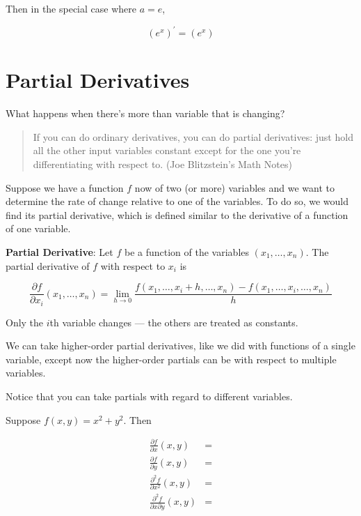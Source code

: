 \documentclass[]{book}
\theoremstyle{definition}
\theoremstyle{definition}
\theoremstyle{definition}
\theoremstyle{remark}
\let\BeginKnitrBlock\begin \let\EndKnitrBlock\end
\begin{document}
Then in the special case where \(a = e\),

\[(e^x)^\prime = (e^x)\]

\hypertarget{partial-derivatives}{%
\section{Partial Derivatives}\label{partial-derivatives}}

What happens when there's more than variable that is changing?

\begin{quote}
If you can do ordinary derivatives, you can do partial derivatives: just hold all the other input variables constant except for the one you're differentiating with respect to. (Joe Blitzstein's Math Notes)
\end{quote}

Suppose we have a function \(f\) now of two (or more) variables and we want to determine the rate of change relative to one of the variables. To do so, we would find its partial derivative, which is defined similar to the derivative of a function of one variable.

\textbf{Partial Derivative}: Let \(f\) be a function of the variables \((x_1,\ldots,x_n)\). The partial derivative of \(f\) with respect to \(x_i\) is

\[\frac{\partial f}{\partial x_i} (x_1,\ldots,x_n) = \lim\limits_{h\to 0} \frac{f(x_1,\ldots,x_i+h,\ldots,x_n)-f(x_1,\ldots,x_i,\ldots,x_n)}{h}\]

Only the \(i\)th variable changes --- the others are treated as constants.

We can take higher-order partial derivatives, like we did with functions of a single variable, except now the higher-order partials can be with respect to multiple variables.

\BeginKnitrBlock{example}[More than one type of partial]
\protect\hypertarget{exm:unnamed-chunk-18}{}{\label{exm:unnamed-chunk-18} {} }Notice that you can take partials with regard to different variables.

Suppose \(f(x,y)=x^2+y^2\). Then

\begin{align*}
\frac{\partial f}{\partial x}(x,y) &=\\
\frac{\partial f}{\partial y}(x,y) &=\\
\frac{\partial^2 f}{\partial x^2}(x,y) &=\\
\frac{\partial^2 f}{\partial x \partial y}(x,y) &=
\end{align*}
\EndKnitrBlock{example}
\end{document}

